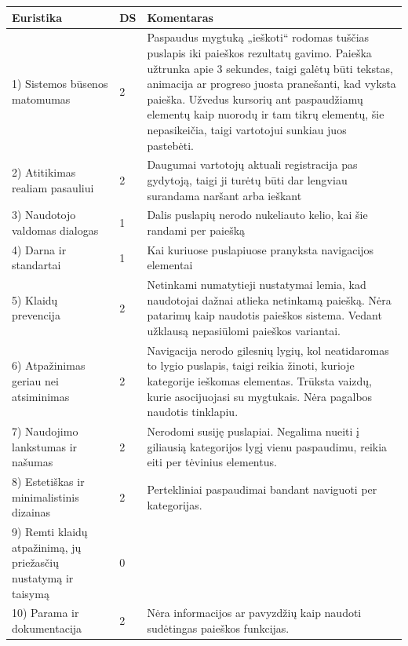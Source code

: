\documentclass{VUMIFPSkursinis}
\begin{document}
\begin{center}
\begin{tabular}{ | p{4cm} | p{} | p{11cm} | } 
 \hline
	Euristika & DS & Komentaras \\ \hline
	1) Sistemos būsenos matomumas & 2 & Paspaudus mygtuką „ieškoti“ rodomas tuščias puslapis iki paieškos rezultatų gavimo. Paieška užtrunka apie 3 sekundes, taigi galėtų būti tekstas, animacija ar progreso juosta pranešanti, kad vyksta paieška. Užvedus kursorių ant paspaudžiamų elementų kaip nuorodų ir tam tikrų elementų, šie nepasikeičia, taigi vartotojui sunkiau juos pastebėti. \\ \hline
	2) Atitikimas realiam pasauliui  & 2 & Daugumai vartotojų aktuali registracija pas gydytoją, taigi ji turėtų būti dar lengviau surandama naršant arba ieškant \\ \hline
	3) Naudotojo valdomas dialogas & 1 & Dalis puslapių nerodo nukeliauto kelio, kai šie randami per paiešką \\ \hline
	4) Darna ir standartai & 1 & Kai kuriuose puslapiuose pranyksta navigacijos elementai \\ \hline
	5) Klaidų prevencija & 2 & Netinkami numatytieji nustatymai lemia, kad naudotojai dažnai atlieka netinkamą paiešką. Nėra patarimų kaip naudotis paieškos sistema. Vedant užklausą nepasiūlomi paieškos variantai. \\ \hline
	6) Atpažinimas geriau nei atsiminimas & 2 & Navigacija nerodo gilesnių lygių, kol neatidaromas to lygio puslapis, taigi reikia žinoti, kurioje kategorije ieškomas elementas. Trūksta vaizdų, kurie asocijuojasi su mygtukais. Nėra pagalbos naudotis tinklapiu. \\ \hline
	7) Naudojimo lankstumas ir našumas & 2 & Nerodomi susiję puslapiai. Negalima nueiti į giliausią kategorijos lygį vienu paspaudimu, reikia eiti per tėvinius elementus. \\ \hline
	8) Estetiškas ir minimalistinis dizainas & 2 & Pertekliniai paspaudimai bandant naviguoti per kategorijas. \\ \hline
	9) Remti klaidų atpažinimą, jų priežasčių nustatymą ir taisymą & 0 &  \\ \hline
	10) Parama ir dokumentacija & 2 & Nėra informacijos ar pavyzdžių kaip naudoti sudėtingas paieškos funkcijas. \\ \hline
\end{tabular}
\label{EuristikųLentelėPrad}
\end{center}
\end{document}
